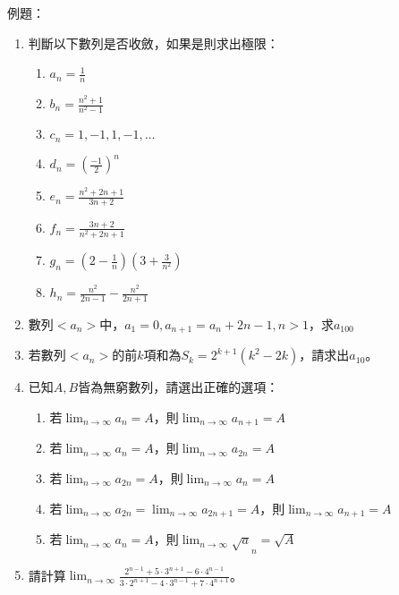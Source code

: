 \documentclass[12pt]{article}
\begin{document}
例題：
\begin{enumerate}
    \item 判斷以下數列是否收斂，如果是則求出極限：
    \begin{enumerate}
        \item $a_n = \frac{1}{n}$\vspace{0.7cm}
        \item $b_n = \frac{n^2 + 1}{n^2 - 1}$\vspace{0.7cm}
        \item $c_n = 1, -1, 1, -1, \ldots$\vspace{0.7cm}
        \item $d_n = \left(\frac{-1}{2}\right)^n$\vspace{0.7cm}
        \item $e_n = \frac{n^2 + 2n + 1}{3n + 2}$\vspace{0.7cm}
        \item $f_n = \frac{3n+2}{n^2 + 2n + 1}$\vspace{0.7cm}
        \item $g_n = \left(2-\frac{1}{n}\right)\left(3+\frac{3}{n^2}\right)$\vspace{0.7cm}
        \item $h_n = \frac{n^2}{2n-1}-\frac{n^2}{2n+1}$\vspace{0.7cm}
    \end{enumerate}
    \item 數列$<a_n>$中，$a_1=0, a_{n+1}=a_n+2n-1, n> 1$，求$a_{100}$\vspace{2cm}
    \item 若數列$<a_n>$的前$k$項和為$S_k = 2^{k+1}(k^2-2k)$，請求出$a_{10}$。\vspace{2cm}
    \item 已知$A, B$皆為無窮數列，請選出正確的選項：
    \begin{enumerate}
        \item 若$\displaystyle\lim_{n\to \infty}a_n=A$，則$\displaystyle\lim_{n\to \infty}a_{n+1}=A$
        \item 若$\displaystyle\lim_{n\to \infty}a_n=A$，則$\displaystyle\lim_{n\to \infty}a_{2n}=A$
        \item 若$\displaystyle\lim_{n\to \infty}a_{2n}=A$，則$\displaystyle\lim_{n\to \infty}a_{n}=A$
        \item 若$\displaystyle\lim_{n\to \infty}a_{2n}=\displaystyle\lim_{n\to \infty}a_{2n+1}=A$，則$\displaystyle\lim_{n\to \infty}a_{n+1}=A$
        \item 若$\displaystyle\lim_{n\to \infty}a_n=A$，則$\displaystyle\lim_{n\to \infty}\sqrt a_{n}=\sqrt A$
    \end{enumerate}
    \item 請計算$\displaystyle\lim_{n\to\infty}\frac{2^{n-1}+5\cdot 3^{n+1}-6\cdot 4^{n-1}}{3\cdot 2^{n+1}-4\cdot 3^{n-1}+7\cdot 4^{n+1}}$。\vspace{2cm}


\end{enumerate}
\end{document}
